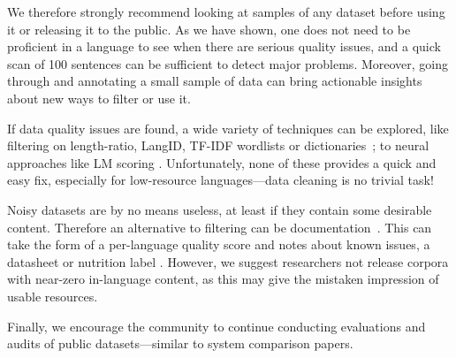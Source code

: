 
We therefore strongly recommend looking at samples of any dataset before using it or releasing it to the public. As we have shown, one does not need to be proficient in a language to see when there are serious quality issues, and a quick scan of 100 sentences can be sufficient to detect major problems. Moreover, going through and annotating a small sample of data can bring actionable insights about new ways to filter or use it.

If data quality issues are found, a wide variety of techniques can be explored, like filtering on length-ratio, LangID, TF-IDF wordlists \cite{caswell-etal-2020-language} or dictionaries~\citep{kamholz-etal-2014-panlex}; to neural approaches like LM scoring \cite{axelrod-etal-2011-domain,moore-lewis-2010-intelligent,wang-etal-2018-denoising}. Unfortunately, none of these provides a quick and easy fix, especially for low-resource languages---data cleaning is no trivial task!

Noisy datasets are by no means useless, at least if they contain some desirable content. Therefore an alternative to filtering can be documentation~\citep{bender-etal-2021-on}. This can take the form of a per-language quality score and notes about known issues,
a datasheet \citep{gebru-etal-2018-datasheets} or nutrition label \citep{holland-etal-2018-the}. However, we suggest researchers not release corpora with near-zero in-language content, as this may give the mistaken impression of usable resources.

Finally, we encourage the community to continue conducting evaluations and audits of public datasets---similar to system comparison papers.
